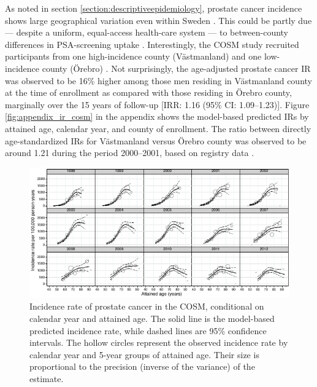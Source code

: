 As noted in section \ref{section:descriptiveepidemiology}, prostate cancer incidence shows large geographical variation even within Sweden \citep{stattin_geographical_2005, jonsson_uptake_2011}. This could be partly due --- despite a uniform, equal-access health-care system --- to between-county differences in PSA-screening uptake  \citep{jonsson_uptake_2011}. Interestingly, the COSM study recruited participants from one high-incidence county (Västmanland) and one low-incidence county (Örebro) \citep{stattin_prostate_2014}. Not surprisingly, the age-adjusted prostate cancer IR was observed to be 16\% higher among those men residing in Västmanland county at the time of enrollment as compared with those residing in Örebro county, marginally over the 15 years of follow-up  [IRR: 1.16 (95\% CI: 1.09--1.23)]. Figure \ref{fig:appendix_ir_cosm} in the appendix shows the model-based predicted IRs by attained age, calendar year, and county of enrollment. The ratio between directly age-standardized IRs for Västmanland versus Örebro county was observed to be around 1.21 during the period 2000--2001, based on registry data \citep[table I]{stattin_geographical_2005}. %

\begin{figure}
\centering
\includegraphics[width=\linewidth]{figures/ir_cosm.pdf}
\caption[Incidence rate of prostate cancer in the COSM by calendar year and attained age]{Incidence rate of prostate cancer in the COSM, conditional on calendar year and attained age. The solid line is the model-based predicted incidence rate, while dashed lines are 95\% confidence intervals. The hollow circles represent the observed incidence rate by calendar year and 5-year groups of attained age. Their size is proportional to the precision (inverse of the variance) of the estimate.}
\label{fig:ir_cosm}
\end{figure}

